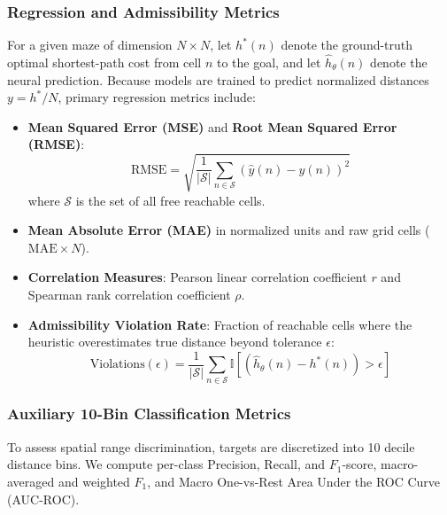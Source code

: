 \subsubsection{Regression and Admissibility Metrics}
For a given maze of dimension $N \times N$, let $h^\ast(n)$ denote the ground-truth optimal
shortest-path cost from cell $n$ to the goal, and let $\hat{h}_\theta(n)$ denote the
neural prediction. Because models are trained to predict normalized distances $y = h^\ast / N$,
primary regression metrics include:
\begin{itemize}
    \item \textbf{Mean Squared Error (MSE)} and \textbf{Root Mean Squared Error (RMSE)}:
    \begin{equation}
        \text{RMSE} = \sqrt{\frac{1}{|\mathcal{S}|} \sum_{n \in \mathcal{S}} \left(\hat{y}(n) - y(n)\right)^2}
    \end{equation}
    where $\mathcal{S}$ is the set of all free reachable cells.
    \item \textbf{Mean Absolute Error (MAE)} in normalized units and raw grid cells ($\text{MAE} \times N$).
    \item \textbf{Correlation Measures}: Pearson linear correlation coefficient $r$ and Spearman rank correlation coefficient $\rho$.
    \item \textbf{Admissibility Violation Rate}: Fraction of reachable cells where the heuristic overestimates true distance beyond tolerance $\epsilon$:
    \begin{equation}
        \text{Violations}(\epsilon) = \frac{1}{|\mathcal{S}|} \sum_{n \in \mathcal{S}} \mathbb{I}\left[(\hat{h}_\theta(n) - h^\ast(n)) > \epsilon\right]
    \end{equation}
\end{itemize}

\subsubsection{Auxiliary 10-Bin Classification Metrics}
To assess spatial range discrimination, targets are discretized into 10 decile distance bins.
We compute per-class Precision, Recall, and $F_1$-score, macro-averaged and weighted $F_1$,
and Macro One-vs-Rest Area Under the ROC Curve (AUC-ROC).

